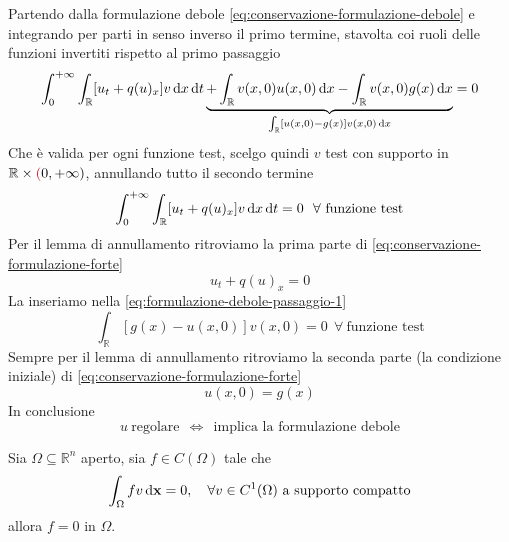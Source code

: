 Partendo dalla formulazione debole \eqref{eq:conservazione-formulazione-debole} e integrando per parti in senso inverso il primo termine, stavolta coi ruoli delle funzioni invertiti rispetto al primo passaggio
\begin{equation}
    \int ^{+\infty }_{0}\int _{\mathbb{R}}[ u_{t}+q(u)_{x}] v\,\mathrm d x\,\mathrm d t\underbrace{+\int _{\mathbb{R}} v(x,0) u(x,0) \,\mathrm d x-\int _{\mathbb{R}} v(x,0) g(x) \,\mathrm d x}_{\int _{\mathbb{R}}[ u(x,0)-g(x)] v(x,0) \,\mathrm d x} =0
    \label{eq:formulazione-debole-passaggio-1}
\end{equation}
Che è valida per ogni funzione test, scelgo quindi $v$ test con supporto in $\mathbb{R} \times \textcolor[rgb]{0.82,0.01,0.11}{(} 0,+\infty)$, annullando tutto il secondo termine
\begin{equation*}
    \int ^{+\infty }_{0}\int _{\mathbb{R}}[ u_{t} +q(u)_{x}] v\,\mathrm d x\,\mathrm d t=0\ \ \forall \ \text{funzione test}
\end{equation*}
Per il lemma di annullamento ritroviamo la prima parte di \eqref{eq:conservazione-formulazione-forte}
\begin{equation*}
    u_{t} +q(u)_{x} =0
\end{equation*}
La inseriamo nella \eqref{eq:formulazione-debole-passaggio-1}
\begin{equation*}
    \int _{\mathbb{R}}[ g(x) -u(x,0)] v(x,0) =0\ \ \forall \ \text{funzione test}
\end{equation*}
Sempre per il lemma di annullamento ritroviamo la seconda parte (la condizione iniziale) di \eqref{eq:conservazione-formulazione-forte}
\begin{equation*}
    u(x,0) =g(x)
\end{equation*}
In conclusione
\begin{equation}
    u\ \text{regolare} \ \ \Leftrightarrow \ \ \text{implica la formulazione debole}
\end{equation}
\begin{theorem}
     Sia $\Omega \subseteq \mathbb{R}^{n}$ aperto, sia $f\in C(\Omega)$ tale che
    \begin{equation}
        \int _{\Omega } fv\,\mathrm d \mathbf{x}=0, \quad \forall  v\in C^{1}(\Omega) \ \text{a supporto compatto}
    \end{equation}
    allora $f=0$ in $\Omega $.
\end{theorem}
